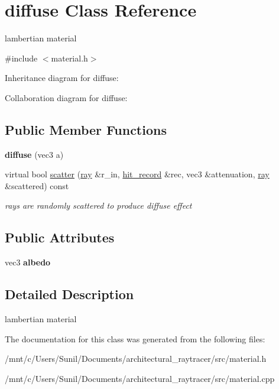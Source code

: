 \hypertarget{classdiffuse}{}\section{diffuse Class Reference}
\label{classdiffuse}


lambertian material  




{\ttfamily \#include $<$material.\+h$>$}



Inheritance diagram for diffuse\+:


Collaboration diagram for diffuse\+:
\subsection*{Public Member Functions}
\begin{DoxyCompactItemize}
\item 
\mbox{\label{classdiffuse_a35de250e9e0a1a5ef292627f49c902e8}} 
{\bfseries diffuse} (vec3 a)
\item 
\mbox{\label{classdiffuse_a4876bba63de5563e0c4b6460224e4bb1}} 
virtual bool \hyperlink{classdiffuse_a4876bba63de5563e0c4b6460224e4bb1}{scatter} (\hyperlink{classray}{ray} \&r\+\_\+in, \hyperlink{structhit__record}{hit\+\_\+record} \&rec, vec3 \&attenuation, \hyperlink{classray}{ray} \&scattered) const
\begin{DoxyCompactList}\small\item\em rays are randomly scattered to produce diffuse effect \end{DoxyCompactList}\end{DoxyCompactItemize}
\subsection*{Public Attributes}
\begin{DoxyCompactItemize}
\item 
\mbox{\label{classdiffuse_afe88849d7ff153c6349a65c469136d5a}} 
vec3 {\bfseries albedo}
\end{DoxyCompactItemize}


\subsection{Detailed Description}
lambertian material 

The documentation for this class was generated from the following files\+:\begin{DoxyCompactItemize}
\item 
/mnt/c/\+Users/\+Sunil/\+Documents/architectural\+\_\+raytracer/src/material.\+h\item 
/mnt/c/\+Users/\+Sunil/\+Documents/architectural\+\_\+raytracer/src/material.\+cpp\end{DoxyCompactItemize}
